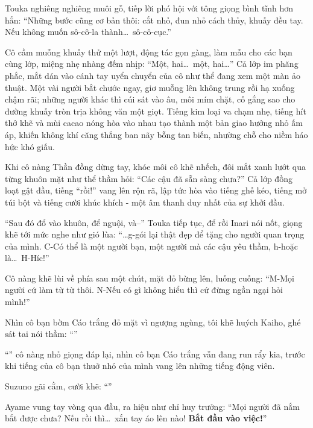 \documentclass[../main.tex]{subfiles}
\begin{document}
Touka nghiêng nghiêng muôi gỗ, tiếp lời phó hội với tông giọng bình tĩnh hơn hẳn: ``Những bước cũng cơ bản thôi: cắt nhỏ, đun nhỏ cách thủy, khuấy đều tay. Nếu không muốn sô-cô-la thành\dots\ sô-cô-cục.''

Cô cầm muỗng khuấy thử một lượt, động tác gọn gàng, làm mẫu cho các bạn cùng lớp, miệng nhẹ nhàng đếm nhịp: ``Một, hai\dots\ một, hai\dots'' Cả lớp im phăng phắc, mắt dán vào cánh tay uyển chuyển của cô như thể đang xem một màn ảo thuật. Một vài người bắt chước ngay, giơ muỗng lên không trung rồi hạ xuống chậm rãi; những người khác thì cúi sát vào âu, môi mím chặt, cố gắng sao cho đường khuấy tròn trịa không văn một giọt. Tiếng kim loại va chạm nhẹ, tiếng hít thở khẽ và mùi cacao nóng hòa vào nhau tạo thành một bản giao hưởng nhỏ ấm áp, khiến không khí căng thẳng ban nãy bỗng tan biến, nhường chỗ cho niềm háo hức khó giấu.

Khi cô nàng Thần đồng dừng tay, khóe môi cô khẽ nhếch, đôi mắt xanh lướt qua từng khuôn mặt như thể thầm hỏi: ``Các cậu đã sẵn sàng chưa?'' Cả lớp đồng loạt gật đầu, tiếng ``rồi!'' vang lên rộn rã, lập tức hòa vào tiếng ghế kéo, tiếng mở túi bột và tiếng cười khúc khích - một âm thanh duy nhất của sự khởi đầu.

``Sau đó đổ vào khuôn, để nguội, và--'' Touka tiếp tục, để rồi Inari nói nốt, giọng khẽ tới mức nghe như gió lùa: ``\dots g-gói lại thật đẹp để tặng cho người quan trọng của mình. C-Có thể là một người bạn, một người mà các cậu yêu thầm, h-hoặc là\dots\ H-Híc!''

Cô nàng khẽ lùi về phía sau một chút, mặt đỏ bừng lên, luống cuống: ``M-Mọi người cứ làm từ từ thôi. N-Nếu có gì không hiểu thì cứ đừng ngần ngại hỏi mình!''

Nhìn cô bạn bờm Cáo trắng đỏ mặt vì ngượng ngùng, tôi khẽ huých Kaiho, ghé sát tai nói thầm: ``''

``'' cô nàng nhỏ giọng đáp lại, nhìn cô bạn Cáo trắng vẫn đang run rẩy kia, trước khi tiếng của cô bạn thuở nhỏ của mình vang lên những tiếng động viên.

Suzuno gãi cằm, cười khẽ: ``''

Ayame vung tay vòng qua đầu, ra hiệu như chỉ huy trưởng: ``Mọi người đã nắm bắt được chưa? Nếu rồi thì\dots\ xắn tay áo lên nào! \textbf{Bắt đầu vào việc!}''
\end{document}
